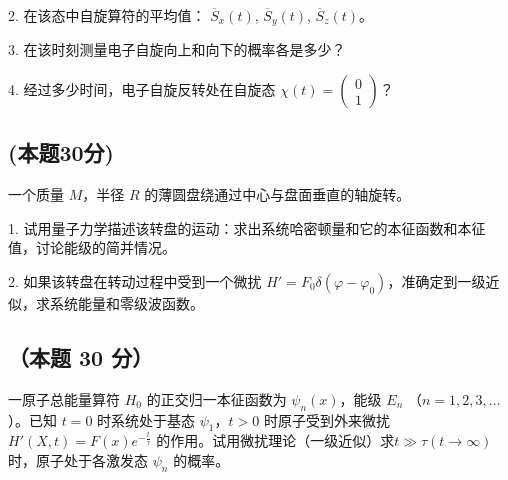 2. 在该态中自旋算符的平均值： $\overline S_x(t)$, $\overline S_y(t) $, $\overline S_z(t)$。

3. 在该时刻测量电子自旋向上和向下的概率各是多少？

4. 经过多少时间，电子自旋反转处在自旋态 $\chi(t) = \begin{pmatrix} 0 \\ 1 \end{pmatrix}$？

\subsection{(本题30分)}
一个质量 $M$，半径 $R$ 的薄圆盘绕通过中心与盘面垂直的轴旋转。

1. 试用量子力学描述该转盘的运动：求出系统哈密顿量和它的本征函数和本征值，讨论能级的简并情况。

2. 如果该转盘在转动过程中受到一个微扰 $H' = F_0 \delta(\varphi - \varphi_0)$，准确定到一级近似，求系统能量和零级波函数。

\subsection{（本题 30 分）}
一原子总能量算符 $H_0$ 的正交归一本征函数为 $\psi_n(x)$，能级 $E_n$ （$n = 1, 2, 3, \ldots$）。已知 $t = 0$ 时系统处于基态 $\psi_1$，$t > 0$ 时原子受到外来微扰 $H'(X,t) = F(x) e^{-\frac{t}{\tau}}$ 的作用。试用微扰理论（一级近似）求$t\gg\tau(t \rightarrow \infty)$ 时，原子处于各激发态 $ \psi_n $ 的概率。
